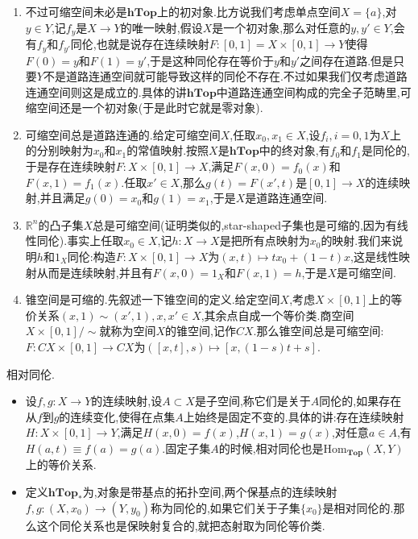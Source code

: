 \begin{enumerate}
\begin{enumerate}
\begin{proof}
			事实上按照上一条得到$1_Y\sim h$,这里$h$是某个$Y$上的常值映射,比方说把$Y$上全部元素映射为某个$y_0\in Y$.于是对任意$X\to Y$的连续映射$f$,总有$f=1_Y\circ f\sim h\circ f=h'$,这里$h'$是把$X$中元素全部映射为$y_0$的常值映射,于是任意两个$X\to Y$的连续映射是同伦的.
		\end{proof}
		\item 不过可缩空间未必是$\textbf{hTop}$上的初对象.比方说我们考虑单点空间$X=\{a\}$,对$y\in Y$,记$f_y$是$X\to Y$的唯一映射,假设$X$是一个初对象,那么对任意的$y,y'\in Y$,会有$f_y$和$f_{y'}$同伦,也就是说存在连续映射$F:[0,1]=X\times[0,1]\to Y$使得$F(0)=y$和$F(1)=y'$,于是这种同伦存在等价于$y$和$y'$之间存在道路.但是只要$Y$不是道路连通空间就可能导致这样的同伦不存在.不过如果我们仅考虑道路连通空间则这是成立的.具体的讲$\textbf{hTop}$中道路连通空间构成的完全子范畴里,可缩空间还是一个初对象(于是此时它就是零对象).
		\item 可缩空间总是道路连通的.给定可缩空间$X$,任取$x_0,x_1\in X$,设$f_i,i=0,1$为$X$上的分别映射为$x_0$和$x_1$的常值映射.按照$X$是$\textbf{hTop}$中的终对象,有$f_0$和$f_1$是同伦的,于是存在连续映射$F:X\times[0,1]\to X$,满足$F(x,0)=f_0(x)$和$F(x,1)=f_1(x)$.任取$x'\in X$,那么$g(t)=F(x',t)$是$[0,1]\to X$的连续映射,并且满足$g(0)=x_0$和$g(1)=x_1$,于是$X$是道路连通空间.
		\item $\mathbb{R}^n$的凸子集$X$总是可缩空间(证明类似的,star-shaped子集也是可缩的,因为有线性同伦).事实上任取$x_0\in X$,记$h:X\to X$是把所有点映射为$x_0$的映射.我们来说明$h$和$1_X$同伦:构造$F:X\times[0,1]\to X$为$(x,t)\mapsto tx_0+(1-t)x$,这是线性映射从而是连续映射,并且有$F(x,0)=1_X$和$F(x,1)=h$,于是$X$是可缩空间.
		\item 锥空间是可缩的.先叙述一下锥空间的定义.给定空间$X$,考虑$X\times[0,1]$上的等价关系$(x,1)\sim(x',1),x,x'\in X$,其余点自成一个等价类.商空间$X\times[0,1]/\sim$就称为空间$X$的锥空间,记作$CX$.那么锥空间总是可缩空间:$F:CX\times[0,1]\to CX$为$([x,t],s)\mapsto[x,(1-s)t+s]$.
	\end{enumerate}
\end{enumerate}

相对同伦.
\begin{itemize}
	\item 设$f,g:X\to Y$的连续映射,设$A\subset X$是子空间,称它们是关于$A$同伦的,如果存在从$f$到$g$的连续变化,使得在点集$A$上始终是固定不变的.具体的讲:存在连续映射$H:X\times[0,1]\to Y$,满足$H(x,0)=f(x)$,$H(x,1)=g(x)$,对任意$a\in A$,有$H(a,t)\equiv f(a)=g(a)$.固定子集$A$的时候,相对同伦也是$\mathrm{Hom}_{\textbf{Top}}(X,Y)$上的等价关系.
	\item 定义$\textbf{hTop}_*$为,对象是带基点的拓扑空间,两个保基点的连续映射$f,g:(X,x_0)\to (Y,y_0)$称为同伦的,如果它们关于子集$\{x_0\}$是相对同伦的.那么这个同伦关系也是保映射复合的,就把态射取为同伦等价类.
\end{itemize}
\newpage
